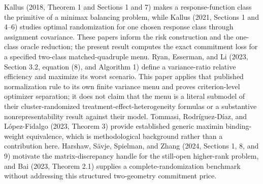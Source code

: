 Kallus (2018, Theorem 1 and Sections 1 and 7) makes a response-function class the primitive of a minimax balancing problem, while Kallus (2021, Sections 1 and 4--6) studies optimal randomization for one chosen response class through assignment covariance. These papers inform the risk construction and the one-class oracle reduction; the present result computes the exact commitment loss for a specified two-class matched-quadruple menu. Ryan, Esserman, and Li (2023, Section 3.2, equation (8), and Algorithm 1) define a variance-ratio relative efficiency and maximize its worst scenario. This paper applies that published normalization rule to its own finite variance menu and proves criterion-level optimizer separation; it does not claim that the menu is a literal submodel of their cluster-randomized treatment-effect-heterogeneity formulas or a substantive nonrepresentability result against their model. Tommasi, Rodr\'iguez-D\'iaz, and L\'opez-Fidalgo (2023, Theorem 3) provide established generic maximin binding-weight equivalence, which is methodological background rather than a contribution here. Harshaw, S\"avje, Spielman, and Zhang (2024, Sections 1, 8, and 9) motivate the matrix-discrepancy handle for the still-open higher-rank problem, and Bai (2023, Theorem 2.1) supplies a complete-randomization benchmark without addressing this structured two-geometry commitment price.